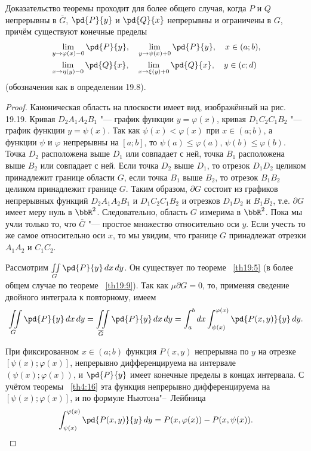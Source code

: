 \begin{notion}
Доказательство теоремы проходит для более общего случая, когда $P$ и $Q$ непрерывны в $\overline{G}$, $\pd{P}{y}$ и $\pd{Q}{x}$ непрерывны и ограничены в $G$, причём существуют конечные пределы
\begin{equation} \label{Grin_lim}
\begin{aligned}
&\lim_{y \to \varphi(x)-0} \pd{P}{y},\quad \lim_{y \to \psi(x)+0} \pd{P}{y}, \quad x \in (a;b), \\
&\lim_{x \to \eta(y)-0} \pd{Q}{x},\quad \lim_{x \to \xi(y)+0} \pd{Q}{x}, \quad y \in (c;d)
\end{aligned}
\end{equation}
(обозначения как в определении 19.8).
\end{notion}

\begin{proof}
Каноническая область на плоскости имеет вид, изображённый на рис. 19.19. Кривая $D_2 A_1 A_2 B_1$ "--- график функции $y = \varphi(x)$, кривая $D_1 C_2 C_1 B_2$ "--- график функции $y = \psi(x)$. Так как $\psi(x) < \varphi(x)$ при $x \in (a;b)$, а функции $\psi$ и $\varphi$ непрерывны на $[a;b]$, то $\psi(a) \leqslant \varphi(a)$, $\psi(b) \leqslant \varphi(b)$. Точка $D_2$ расположена выше $D_1$ или совпадает с ней, точка $B_1$ расположена выше $B_2$ или совпадает с ней. Если точка $D_2$ выше $D_1$, то отрезок $D_1 D_2$ целиком принадлежит границе области $G$, если точка $B_1$ выше $B_2$, то отрезок $B_1 B_2$ целиком принадлежит границе $G$. Таким образом, $\partial G$ состоит из графиков непрерывных функций $D_2 A_1 A_2 B_1$ и $D_1 C_2 C_1 B_2$ и отрезков $D_1 D_2$ и $B_1 B_2$, т.е. $\partial G$ имеет меру нуль в $\bbR^2$. Следовательно, область $G$ измерима в $\bbR^2$. Пока мы учли только то, что $\overline{G}$ "--- простое множество относительно оси $y$. Если учесть то же самое относительно оси $x$, то мы увидим, что границе $G$ принадлежат отрезки $A_1 A_2$ и $C_1 C_2$.

Рассмотрим $\iint\limits_G \pd{P}{y}\,dx\,dy$. Он существует по теореме ~\ref{th19:5} (в более общем случае по теореме ~\ref{th19:9}). Так как $\mu \partial G = 0$, то, применяя сведение двойного интеграла к повторному, имеем
$$
\iint\limits_G \pd{P}{y}\,dx\,dy = \iint\limits_{\overline{G}} \pd{P}{y}\,dx\,dy = \int_a^b dx \int_{\psi(x)}^{\varphi(x)} \pd{P(x,y)}{y}\,dy.
$$

При фиксированном $x \in (a;b)$ функция $P(x,y)$ непрерывна по $y$ на отрезке $[\psi(x); \varphi(x)]$, непрерывно дифференцируема на интервале $(\psi(x); \varphi(x))$, и $\pd{P}{y}$ имеет конечные пределы в концах интервала. С учётом теоремы ~\ref{th4:16} эта функция непрерывно дифференцируема на $[\psi(x); \varphi(x)]$, и по формуле Ньютона"--~Лейбница
$$
\int_{\psi(x)}^{\varphi(x)} \pd{P(x,y)}{y}\,dy = P(x,\varphi(x)) - P(x,\psi(x)).
$$


\end{proof}
